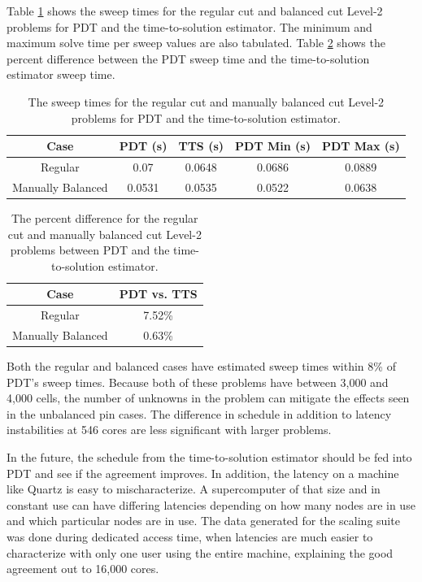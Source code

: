 Table \ref{level2_sweep_times} shows the sweep times for the regular cut and balanced cut Level-2 problems for PDT and the time-to-solution estimator. The minimum and maximum solve time per sweep values are also tabulated.
Table \ref{level2_percent_diff} shows the percent difference between the PDT sweep time and the time-to-solution estimator sweep time.
\begin{table}[ht]
\centering
\caption{The sweep times for the regular cut and manually balanced cut Level-2 problems for PDT and the time-to-solution estimator.}
\label{level2_sweep_times}
\begin{tabular}{c|c|c|c|c}
\bf Case & \bf PDT (s) & \bf TTS (s) & \bf PDT Min (s) & \bf PDT Max (s) \\ \hline
Regular & 0.07 & 0.0648 & 0.0686 & 0.0889\\ \hline
Manually Balanced & 0.0531 & 0.0535 & 0.0522 & 0.0638
\end{tabular}
\end{table}
\begin{table}[ht]
\centering
\caption{The percent difference for the regular cut and manually balanced cut Level-2 problems between PDT and the time-to-solution estimator.}
\label{level2_percent_diff}
\begin{tabular}{c|c}
\textbf{Case} & \bf PDT vs. TTS \\ \hline
Regular & 7.52\% \\ \hline
Manually Balanced & 0.63\%
\end{tabular}
\end{table}
Both the regular and balanced cases have estimated sweep times within 8\% of PDT's sweep times.
Because both of these problems have between 3,000 and 4,000 cells, the number of unknowns in the problem can mitigate the effects seen in the unbalanced pin cases.
The difference in schedule in addition to latency instabilities at 546 cores are less significant with larger problems.

In the future, the schedule from the time-to-solution estimator should be fed into PDT and see if the agreement improves.
In addition, the latency on a machine like Quartz is easy to mischaracterize.
A supercomputer of that size and in constant use can have differing latencies depending on how many nodes are in use and which particular nodes are in use.
The data generated for the scaling suite was done during dedicated access time, when latencies are much easier to characterize with only one user using the entire machine, explaining the good agreement out to 16,000 cores.

